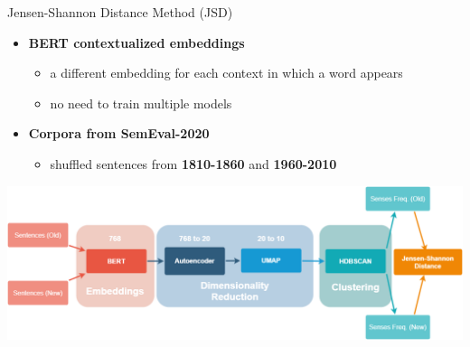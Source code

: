 \documentclass[10pt,aspectratio=1610,professionalfont]{beamer}
\begin{document}
\begin{frame}{Jensen-Shannon Distance Method (JSD)}
    \begin{itemize}
        \item \textbf{BERT contextualized embeddings}
        \begin{itemize}
            \item a different embedding for each context in which a word appears
            \item no need to train multiple models 
        \end{itemize}
        \item \textbf{Corpora from SemEval-2020}
        \begin{itemize}
            \item shuffled sentences from \textbf{1810-1860} and \textbf{1960-2010}
        \end{itemize}
    \end{itemize}
	\centering
    \includegraphics[scale=0.33]{img/JSD.PNG}
\end{frame}
\end{document}

